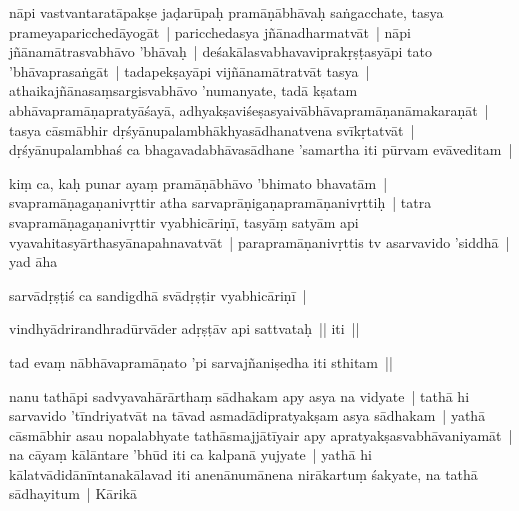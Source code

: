 \documentclass[article,12pt,a4paper]{memoir}%
\newcounter{parCount}
\begin{document}
	  \pstart \leavevmode%
	\label{thakur75-28.27}nāpi vastvantaratāpakṣe jaḍarūpaḥ pramāṇābhāvaḥ saṅgacchate, tasya prameyaparicchedāyogāt | paricchedasya jñānadharmatvāt | nāpi jñānamātrasvabhāvo 'bhāvaḥ | deśakālasvabhavaviprakṛṣṭasyāpi tato 'bhāvaprasaṅgāt | tadapekṣayāpi vijñānamātratvāt tasya | athaikajñānasaṃsargisvabhāvo 'numanyate, tadā kṣatam abhāvapramāṇapratyāśayā, adhyakṣaviśeṣasyaivābhāvapramāṇanāmakaraṇāt | tasya cāsmābhir dṛśyānupalambhākhyasādhanatvena svīkṛtatvāt | dṛśyānupalambhaś ca bhagavadabhāvasādhane 'samartha iti pūrvam evāveditam | 
	{}
	\pend%
      

	  \pstart \leavevmode%
	\label{thakur75-29.1}kiṃ ca, kaḥ punar ayaṃ pramāṇābhāvo 'bhimato bhavatām | svapramāṇagaṇanivṛttir atha sarvaprāṇigaṇapramāṇanivṛttiḥ | tatra svapramāṇagaṇanivṛttir vyabhicāriṇī, tasyāṃ satyām api vyavahitasyārthasyānapahnavatvāt | parapramāṇanivṛttis tv asarvavido 'siddhā | yad āha 
	{}
	\pend%
      

	  \pstart \leavevmode%
	sarvādṛṣṭiś ca sandigdhā svādṛṣṭir vyabhicāriṇī | 
	{}
	\pend%
      

	  \pstart \leavevmode%
	vindhyādrirandhradūrvāder adṛṣṭāv api sattvataḥ || iti || 
	{}
	\pend%
      

	  \pstart \leavevmode%
	tad evaṃ nābhāvapramāṇato 'pi sarvajñaniṣedha iti sthitam || 
	{}
	\pend%
      

	  \pstart \leavevmode%
	\label{thakur75-29.8}nanu tathāpi sadvyavahārārthaṃ sādhakam apy asya na vidyate | tathā hi sarvavido 'tīndriyatvāt na tāvad asmadādipratyakṣam asya sādhakam | yathā cāsmābhir asau nopalabhyate tathāsmajjātīyair apy apratyakṣasvabhāvaniyamāt | na cāyaṃ kālāntare 'bhūd iti ca kalpanā yujyate | yathā hi kālatvādidānīntanakālavad iti anenānumānena nirākartuṃ śakyate, na tathā sādhayitum | Kārikā 
	{}
	\pend%
      
\end{document}
